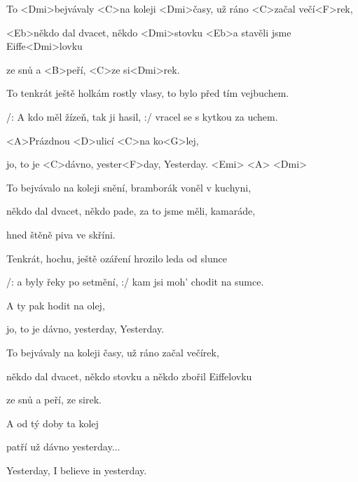 

\zs
To <Dmi>bejvávaly <C>na koleji <Dmi>časy,
už ráno <C>začal večí<F>rek,

<Eb>někdo dal dvacet, někdo <Dmi>stovku
<Eb>a stavěli jsme Eiffe<Dmi>lovku

ze snů a <B>peří, <C>ze si<Dmi>rek.
\ks

\zs
To tenkrát ještě holkám rostly vlasy,
to bylo před tím vejbuchem.

/: A kdo měl žízeň, tak ji hasil, :/
vracel se s kytkou za uchem.
\ks

\zr
<A>Prázdnou <D>ulicí <C>na ko<G>lej,

jo, to je <C>dávno, yester<F>day, Yesterday.
<Emi> <A> <Dmi>
\kr

\zs
To bejvávalo na koleji snění,
bramborák voněl v kuchyni,

někdo dal dvacet, někdo pade,
za to jsme měli, kamaráde,

hned štěně piva ve skříni.
\ks

\zs
Tenkrát, hochu, ještě ozáření
hrozilo leda od slunce

/: a byly řeky po setmění, :/ kam jsi moh' chodit na sumce.
\ks

\zr
A ty pak hodit na olej,

jo, to je dávno, yesterday, Yesterday.
\kr

\zs
To bejvávaly na koleji časy,
už ráno začal večírek,

někdo dal dvacet, někdo stovku
a někdo zbořil Eiffelovku

ze snů a peří, ze sirek.
\ks

\zr
A od tý doby ta kolej

patří už dávno yesterday...

Yesterday, I believe in yesterday.
\kr

\kp
